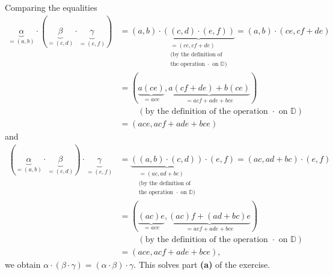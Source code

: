 \documentclass[paper=a4, fontsize=12pt]{scrartcl}%
\theoremstyle{plainsl}
\theoremstyle{definition}
\theoremstyle{remark}
\begin{document}
Comparing the equalities
\begin{align*}
\underbrace{\alpha}_{=\left(  a,b\right)  }\cdot\left(  \underbrace{\beta
}_{=\left(  c,d\right)  }\cdot\underbrace{\gamma}_{=\left(  e,f\right)
}\right)   &  =\left(  a,b\right)  \cdot\underbrace{\left(  \left(
c,d\right)  \cdot\left(  e,f\right)  \right)  }_{\substack{=\left(
ce,cf+de\right)  \\\text{(by the definition of} \\\text{the operation }%
\cdot\text{ on }\mathbb{D}\text{)}}}=\left(  a,b\right)  \cdot\left(
ce,cf+de\right) \\
&  =\left(  \underbrace{a\left(  ce\right)  }_{=ace},\underbrace{a\left(
cf+de\right)  +b\left(  ce\right)  }_{=acf+ade+bce}\right) \\
&  \ \ \ \ \ \ \ \ \ \ \left(  \text{by the definition of the operation }%
\cdot\text{ on }\mathbb{D}\right) \\
&  =\left(  ace,acf+ade+bce\right)
\end{align*}
and%
\begin{align*}
\left(  \underbrace{\alpha}_{=\left(  a,b\right)  }\cdot\underbrace{\beta
}_{=\left(  c,d\right)  }\right)  \cdot\underbrace{\gamma}_{=\left(
e,f\right)  }  &  =\underbrace{\left(  \left(  a,b\right)  \cdot\left(
c,d\right)  \right)  } _{\substack{=\left(  ac,ad+bc\right)  \\\text{(by the
definition of} \\\text{the operation }\cdot\text{ on }\mathbb{D}\text{)}%
}}\cdot\left(  e,f\right)  =\left(  ac,ad+bc\right)  \cdot\left(  e,f\right)
\\
&  =\left(  \underbrace{\left(  ac\right)  e}_{=ace},\underbrace{\left(
ac\right)  f+\left(  ad+bc\right)  e}_{=acf+ade+bce}\right) \\
&  \ \ \ \ \ \ \ \ \ \ \left(  \text{by the definition of the operation }%
\cdot\text{ on }\mathbb{D}\right) \\
&  =\left(  ace,acf+ade+bce\right)  ,
\end{align*}
we obtain $\alpha\cdot\left(  \beta\cdot\gamma\right)  =\left(  \alpha
\cdot\beta\right)  \cdot\gamma$. This solves part \textbf{(a)} of the
exercise.\\[0.4cm]
\end{document}
